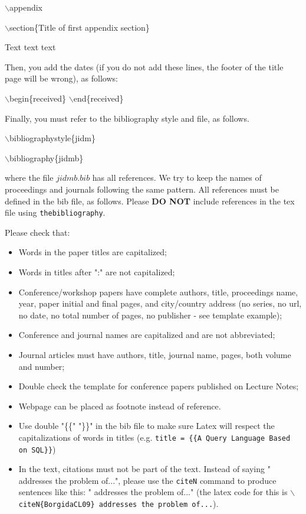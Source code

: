 \documentclass[jidm,a4paper]{jidm} %
\newenvironment{latexcode}
{\ttfamily\vspace{0.1in}\setlength{\parindent}{18pt}}
{\vspace{0.1in}}
\begin{document}
\begin{latexcode}
	$\backslash$appendix
	
	$\backslash$section\{Title of first appendix section\}

	Text text text
\end{latexcode}

Then, you add the dates (if you do not add these lines, the footer of the title page will be wrong), as follows:

\begin{latexcode}
	$\backslash$begin\{received\}
	$\backslash$end\{received\}
\end{latexcode}

Finally, you must refer to the bibliography style and file, as follows.

	\begin{latexcode}
		$\backslash$bibliographystyle\{jidm\}

		$\backslash$bibliography\{jidmb\}
	\end{latexcode}

\noindent where the file $jidmb.bib$ has all references. We try to keep the names of proceedings and journals following the same pattern. All references must be defined in the bib file, as follows. Please \textbf{DO NOT} include references in the tex file using \texttt{thebibliography}.

Please check that:  

\begin{itemize}
\item Words in the paper titles are capitalized;
\item Words in titles after ":" are not capitalized;
\item Conference/workshop papers have complete authors, title, proceedings name, year, paper initial and final pages, and city/country address (no series, no url, no date, no total number of pages, no publisher - see template example);
\item Conference and journal names are capitalized and are not abbreviated;
\item Journal articles must have authors, title, journal name, pages, both volume and number; 
\item Double check the template for conference papers published on Lecture Notes; 
\item Webpage can be placed as footnote instead of reference.
\item Use double "\{\{" "\}\}" in the bib file to make sure Latex will respect the capitalizations of words in titles (e.g. \texttt{title = \{\{A Query Language Based on SQL\}\}})
\item In the text, citations must not be part of the text. Instead of saying "\cite{BorgidaCL09} addresses the problem of...", please use the \texttt{citeN} command to produce sentences like this: " addresses the problem of..." (the latex code for this is \texttt{$\backslash$citeN\{BorgidaCL09\} addresses the problem of...}). 
\end{itemize}
\end{document}
